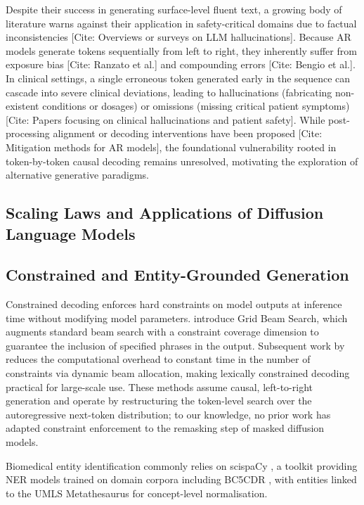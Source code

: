 \documentclass[11pt]{article}
\begin{document}
Despite their success in generating surface-level fluent text, a growing body of literature warns against their application in safety-critical domains due to factual inconsistencies [Cite: Overviews or surveys on LLM hallucinations]. Because AR models generate tokens sequentially from left to right, they inherently suffer from exposure bias [Cite: Ranzato et al.] and compounding errors [Cite: Bengio et al.]. In clinical settings, a single erroneous token generated early in the sequence can cascade into severe clinical deviations, leading to hallucinations (fabricating non-existent conditions or dosages) or omissions (missing critical patient symptoms) [Cite: Papers focusing on clinical hallucinations and patient safety]. While post-processing alignment or decoding interventions have been proposed [Cite: Mitigation methods for AR models], the foundational vulnerability rooted in token-by-token causal decoding remains unresolved, motivating the exploration of alternative generative paradigms.

\subsection{Scaling Laws and Applications of Diffusion Language Models}

\subsection{Constrained and Entity-Grounded Generation}

Constrained decoding enforces hard constraints on model outputs at
inference time without modifying model parameters. \citet{hokamp2017lexically}
introduce Grid Beam Search, which augments standard beam search with a
constraint coverage dimension to guarantee the inclusion of specified
phrases in the output. Subsequent work by \citet{post2018fast} reduces
the computational overhead to constant time in the number of constraints
via dynamic beam allocation, making lexically constrained decoding
practical for large-scale use. These methods assume causal, left-to-right
generation and operate by restructuring the token-level search over the
autoregressive next-token distribution; to our knowledge, no prior work
has adapted constraint enforcement to the remasking step of masked
diffusion models.

Biomedical entity identification commonly relies on scispaCy
\citep{neumann2019scispacy}, a toolkit providing NER models trained on
domain corpora including BC5CDR \citep{li2016biocreative}, with
entities linked to the UMLS Metathesaurus \citep{bodenreider2004umls}
for concept-level normalisation.
\end{document}
